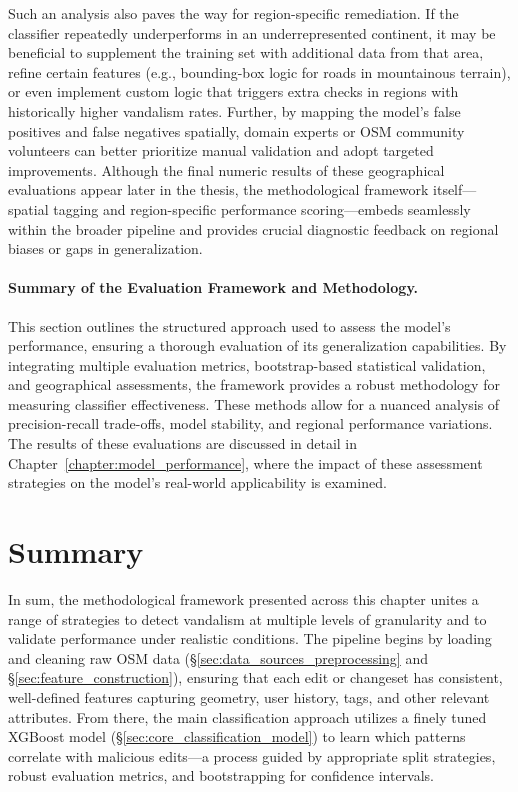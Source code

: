 \documentclass[
    13pt, %
    a4paper, %
    listof=totoc, %
    bibliography=totoc, %
    index=totoc, %
    headsepline
]{scrreprt}
\begin{document}
Such an analysis also paves the way for region-specific remediation. If the classifier repeatedly underperforms in an underrepresented continent, it may be beneficial to supplement the training set with additional data from that area, refine certain features (e.g., bounding-box logic for roads in mountainous terrain), or even implement custom logic that triggers extra checks in regions with historically higher vandalism rates. Further, by mapping the model’s false positives and false negatives spatially, domain experts or OSM community volunteers can better prioritize manual validation and adopt targeted improvements. Although the final numeric results of these geographical evaluations appear later in the thesis, the methodological framework itself—spatial tagging and region-specific performance scoring—embeds seamlessly within the broader pipeline and provides crucial diagnostic feedback on regional biases or gaps in generalization.

\paragraph{Summary of the Evaluation Framework and Methodology.}  
This section outlines the structured approach used to assess the model’s performance, ensuring a thorough evaluation of its generalization capabilities. By integrating multiple evaluation metrics, bootstrap-based statistical validation, and geographical assessments, the framework provides a robust methodology for measuring classifier effectiveness. These methods allow for a nuanced analysis of precision-recall trade-offs, model stability, and regional performance variations. The results of these evaluations are discussed in detail in Chapter~\ref{chapter:model_performance}, where the impact of these assessment strategies on the model's real-world applicability is examined.

\section{Summary}
\label{sec:method_summary_integration}

In sum, the methodological framework presented across this chapter unites a range of strategies to detect vandalism at multiple levels of granularity and to validate performance under realistic conditions. The pipeline begins by loading and cleaning raw OSM data (\S\ref{sec:data_sources_preprocessing} and \S\ref{sec:feature_construction}), ensuring that each edit or changeset has consistent, well-defined features capturing geometry, user history, tags, and other relevant attributes. From there, the main classification approach utilizes a finely tuned XGBoost model (\S\ref{sec:core_classification_model}) to learn which patterns correlate with malicious edits—a process guided by appropriate split strategies, robust evaluation metrics, and bootstrapping for confidence intervals.
\end{document}

